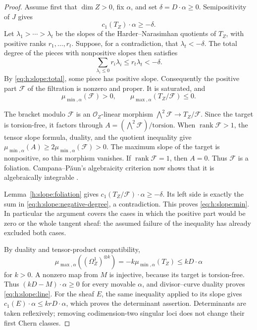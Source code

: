 \begin{proof}
Assume first that $\dim Z>0$, fix $\alpha$, and set
$\delta=D\cdot\alpha\geq0$.  Semipositivity of $J$ gives
\begin{equation}\label{eq:h:slope:total}
                         c_1(T_Z)\cdot\alpha\geq-\delta.
\end{equation}
Let $\lambda_1>\cdots>\lambda_t$ be the slopes of the
Harder--Narasimhan quotients of $T_Z$, with positive ranks
$r_1,\ldots,r_t$.  Suppose, for a contradiction, that
$\lambda_t<-\delta$.  The total degree of the pieces with
nonpositive slopes then satisfies
\begin{equation}\label{eq:h:slope:negative-degree}
       \sum_{\lambda_i\leq0}r_i\lambda_i
                     \leq r_t\lambda_t<-\delta.
\end{equation}
By \eqref{eq:h:slope:total}, some piece has positive slope.
Consequently the positive part $\mathcal F$ of the filtration is
nonzero and proper.  It is saturated, and
\[
 \mu_{\min,\alpha}(\mathcal F)>0,
 \qquad \mu_{\max,\alpha}(T_Z/\mathcal F)\leq0.
\]

The bracket modulo $\mathcal F$ is an $\mathcal O_Z$-linear morphism
$\bigwedge^2\mathcal F\to T_Z/\mathcal F$.  Since the target is
torsion-free, it factors through
$A=(\bigwedge^2\mathcal F)/\mathrm{torsion}$.  When
$\operatorname{rank}\mathcal F>1$, the tensor slope formula, duality,
and the quotient inequality give
$\mu_{\min,\alpha}(A)\geq2\mu_{\min,\alpha}(\mathcal F)>0$.
The maximum slope of the target is nonpositive, so this morphism
vanishes.  If $\operatorname{rank}\mathcal F=1$, then $A=0$.
Thus $\mathcal F$ is a foliation.  Campana--P\u{a}un's algebraicity
criterion now shows that it is algebraically integrable
\cite[Theorem~1.1]{CampanaPaun2019}.

Lemma~\ref{h:slope:foliation} gives
$c_1(T_Z/\mathcal F)\cdot\alpha\geq-\delta$.  Its left side is
exactly the sum in \eqref{eq:h:slope:negative-degree}, a
contradiction.  This proves \eqref{eq:h:slope:min}.  In particular the
argument covers the cases in which the positive part would be zero
or the whole tangent sheaf: the assumed failure of the inequality
has already excluded both cases.

By duality and tensor-product compatibility,
\[
 \mu_{\max,\alpha}((\Omega_Z^1)^{\otimes k})
                 =-k\mu_{\min,\alpha}(T_Z)
                 \leq kD\cdot\alpha
\]
for $k>0$.  A nonzero map from $M$ is injective, because its target is
torsion-free.  Thus $(kD-M)\cdot\alpha\geq0$ for every movable
$\alpha$, and divisor--curve duality proves
\eqref{eq:h:slope:line}.  For the sheaf $E$, the same inequality
applied to its slope gives
$c_1(E)\cdot\alpha\leq krD\cdot\alpha$, which proves the determinant
assertion.  Determinants are taken reflexively; removing
codimension-two singular loci does not change their first Chern
classes.


\end{proof}
